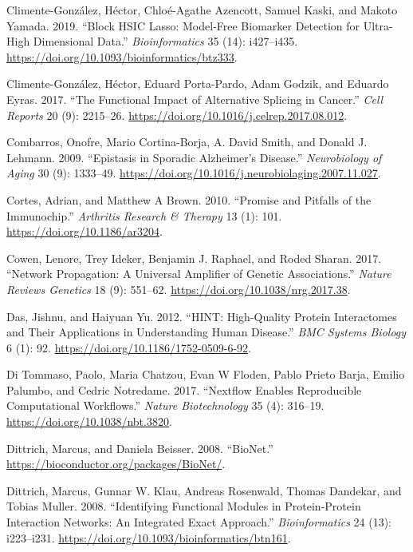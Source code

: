 \documentclass[
  11pt,
]{env/yjiao}
\newlength{\cslhangindent}
\newenvironment{cslreferences}%
  {\setlength{\parindent}{0pt}%
  \everypar{\setlength{\hangindent}{\cslhangindent}}\ignorespaces}%
  {\par}
\begin{document}
\begin{cslreferences}
\leavevmode\hypertarget{ref-climente-gonzalez_block_2019}{}%
Climente-González, Héctor, Chloé-Agathe Azencott, Samuel Kaski, and Makoto Yamada. 2019. ``Block HSIC Lasso: Model-Free Biomarker Detection for Ultra-High Dimensional Data.'' \emph{Bioinformatics} 35 (14): i427--i435. \url{https://doi.org/10.1093/bioinformatics/btz333}.

\leavevmode\hypertarget{ref-climente-gonzalez_functional_2017}{}%
Climente-González, Héctor, Eduard Porta-Pardo, Adam Godzik, and Eduardo Eyras. 2017. ``The Functional Impact of Alternative Splicing in Cancer.'' \emph{Cell Reports} 20 (9): 2215--26. \url{https://doi.org/10.1016/j.celrep.2017.08.012}.

\leavevmode\hypertarget{ref-combarros_epistasis_2009}{}%
Combarros, Onofre, Mario Cortina-Borja, A. David Smith, and Donald J. Lehmann. 2009. ``Epistasis in Sporadic Alzheimer's Disease.'' \emph{Neurobiology of Aging} 30 (9): 1333--49. \url{https://doi.org/10.1016/j.neurobiolaging.2007.11.027}.

\leavevmode\hypertarget{ref-cortes_promise_2010}{}%
Cortes, Adrian, and Matthew A Brown. 2010. ``Promise and Pitfalls of the Immunochip.'' \emph{Arthritis Research \& Therapy} 13 (1): 101. \url{https://doi.org/10.1186/ar3204}.

\leavevmode\hypertarget{ref-cowen_network_2017}{}%
Cowen, Lenore, Trey Ideker, Benjamin J. Raphael, and Roded Sharan. 2017. ``Network Propagation: A Universal Amplifier of Genetic Associations.'' \emph{Nature Reviews Genetics} 18 (9): 551--62. \url{https://doi.org/10.1038/nrg.2017.38}.

\leavevmode\hypertarget{ref-das_hint_2012}{}%
Das, Jishnu, and Haiyuan Yu. 2012. ``HINT: High-Quality Protein Interactomes and Their Applications in Understanding Human Disease.'' \emph{BMC Systems Biology} 6 (1): 92. \url{https://doi.org/10.1186/1752-0509-6-92}.

\leavevmode\hypertarget{ref-di_tommaso_nextflow_2017}{}%
Di Tommaso, Paolo, Maria Chatzou, Evan W Floden, Pablo Prieto Barja, Emilio Palumbo, and Cedric Notredame. 2017. ``Nextflow Enables Reproducible Computational Workflows.'' \emph{Nature Biotechnology} 35 (4): 316--19. \url{https://doi.org/10.1038/nbt.3820}.

\leavevmode\hypertarget{ref-heinz}{}%
Dittrich, Marcus, and Daniela Beisser. 2008. ``BioNet.'' \url{https://bioconductor.org/packages/BioNet/}.

\leavevmode\hypertarget{ref-dittrich_identifying_2008}{}%
Dittrich, Marcus, Gunnar W. Klau, Andreas Rosenwald, Thomas Dandekar, and Tobias Muller. 2008. ``Identifying Functional Modules in Protein-Protein Interaction Networks: An Integrated Exact Approach.'' \emph{Bioinformatics} 24 (13): i223--i231. \url{https://doi.org/10.1093/bioinformatics/btn161}.


\end{cslreferences}
\end{document}
